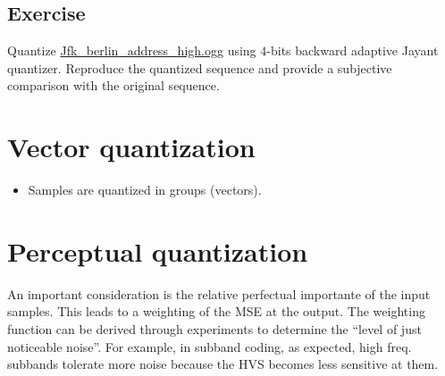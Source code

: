 \subsection{Exercise}
Quantize
\href{https://upload.wikimedia.org/wikipedia/commons/3/3a/Jfk_berlin_address_high.ogg}{Jfk\_berlin\_address\_high.ogg}
using \(4\)-bits backward adaptive Jayant quantizer. Reproduce the
quantized sequence and provide a subjective comparison with the original
sequence.

\section{Vector quantization}
\begin{itemize}
\item Samples are quantized in groups (vectors).
\end{itemize}
  
\section{Perceptual quantization}
An important consideration is the relative perfectual importante of
the input samples. This leads to a weighting of the MSE at the
output. The weighting function can be derived through experiments to
determine the ``level of just noticeable noise''. For example, in
subband coding, as expected, high freq. subbands tolerate more noise
because the HVS becomes less sensitive at them.


